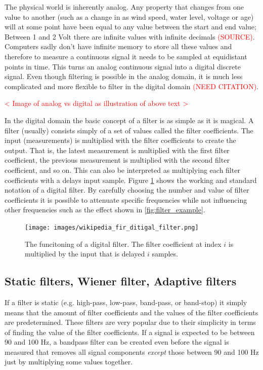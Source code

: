The physical world is inherently analog. Any property that changes from one value to another (such as a change in as wind speed, water level, voltage or age) will at some point have been equal to any value between the start and end value; Between 1 and 2 Volt there are infinite values with infinite decimals \textcolor{red}{(SOURCE)}. Computers sadly don't have infinite memory to store all these values and therefore to measure a continuous signal it needs to be sampled at equidistant points in time. This turns an analog continuous signal into a digital discrete signal. Even though filtering is possible in the analog domain, it is much less complicated and more flexible to filter in the digital domain \textcolor{red}{(NEED CITATION)}.

\textcolor{red}{< Image of analog vs digital as illustration of above text >}

In the digital domain the basic concept of a filter is as simple as it is magical. A filter (usually) consists simply of a set of values called the filter coefficients. The input (measurements) is multiplied with the filter coefficients to create the output. That is, the latest measurement is multiplied with the first filter coefficient, the previous measurement is multiplied with the second filter coefficient, and so on. This can also be interpreted as multiplying each filter coefficients with a delays input sample. Figure \ref{fig:wiki_digital_filter_working} shows the working and standard notation of a digital filter.
By carefully choosing the number and value of filter coefficients it is possible to attenuate specific frequencies while not influencing other frequencies such as the effect shown in \ref{fig:filter_example}.

\begin{figure}[h!t]
	\begin{center}
		\texttt{[image: images/wikipedia\_fir\_ditigal\_filter.png]}
	\end{center}
	\caption{The funcitoning of a digital filter. The filter coefficient at index $i$ is multiplied by the input that is delayed $i$ samples.}
	\label{fig:wiki_digital_filter_working}
\end{figure}

\subsection{Static filters, Wiener filter, Adaptive filters}
If a filter is static (e.g. high-pass, low-pass, band-pass, or band-stop) it simply means that the amount of filter coefficients and the values of the filter coefficients are predetermined. These filters are very popular due to their simplicity in terms of finding the value of the filter coefficients. If a signal is expected to be between 90 and 100 Hz, a bandpass filter can be created even before the signal is measured that removes all signal components \textit{except} those between 90 and 100 Hz just by multiplying some values together. 

